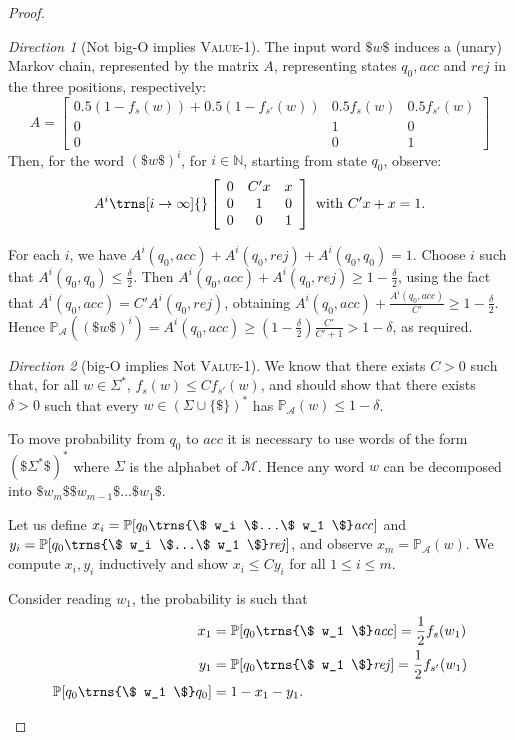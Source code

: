 \documentclass{lmcs}
\theoremstyle{plain}
\theoremstyle{definition}
\theoremstyle{remark}
\newtheorem{dir}{Direction}
\newcommand\acc{\mathit{acc}}
\newcommand\rej{\mathit{rej}}
\newcommand\lmc{\mathcal{M}}
\newcommand\pr{\mathbb{P}}
\newcommand\pa{\mathcal{A}}
\renewcommand\nu{f}
\begin{document}
\begin{proof}
\begin{dir}[Not big-O implies \textsc{Value-1}]
The input word $\$w\$$ induces a (unary) Markov chain, represented by the matrix $A$, representing states $q_0, \acc$ and $\rej$ in the three positions, respectively:\[A = \left[
\begin{array}{ccccc}
0.5(1-\nu_s(w)) + 0.5(1-\nu_{s'}(w))  & 0.5\nu_s(w) & 0.5\nu_{s'}(w) \\
0 & 1 & 0 \\
0 & 0 & 1
\end{array}
\right]
\]
Then, for the word $(\$w\$)^i$, for $i \in \mathbb{N}$, starting from state $q_0$, observe:
\[
A^i
\trns[i\to\infty]{}
\left[\begin{array}{ccccc}
0 & C' x & x \\
0 & 1 & 0 \\
0 & 0 & 1 \\
\end{array}\right] \text{ with } C'x + x = 1.
\]

For each $i$, we have $A^i(q_0,\acc) +A^i(q_0,\rej) +A^i(q_0,q_0)= 1 $. Choose $i$ such that $A^i(q_0,q_0) \le \frac{\delta}{2}$. Then $A^i(q_0,\acc) +A^i(q_0,\rej) \ge 1 -\frac{\delta}{2} $, using the fact that  $A^i(q_0,\acc) = C' A^i(q_0,\rej)$,  obtaining $A^i(q_0,\acc) +\frac{A^i(q_0,\acc)}{C'} \ge 1 - \frac{\delta}{2}$. Hence $\pr_\pa((\$w\$)^i) = A^i(q_0,\acc) \ge (1 - \frac{\delta}{2})\frac{C'}{C'+1} > 1-\delta $, as required.
\end{dir}

\begin{dir}[big-O implies Not \textsc{Value-1}]

We know that there exists $C > 0$ such that, for all $w \in \Sigma^*$, $\nu_s(w) \le C \nu_{s'}(w)$, and should show that there exists $\delta > 0 $ such that every $w \in (\Sigma \cup\{\$\})^*$ has $\pr_\pa(w) \le 1-\delta$.

To move probability from $q_0$ to $\acc$ it is necessary to use words of the form $(\$ \Sigma^* \$)^*$ where $\Sigma$ is the alphabet of $\lmc$. Hence any word $w$ can be decomposed into $\$ w_m \$\$ w_{m-1} \$...\$ w_1 \$$.

Let us define $x_i = \pr[q_0 \trns{\$ w_i \$...\$ w_1 \$} \acc]$ and $y_i = \pr[q_0 \trns{\$ w_i \$...\$ w_1 \$} \rej]$, and observe $x_m =  \pr_\pa(w)$. We compute $x_i,y_i$ inductively and show $x_i\le C y_i$ for all $1\le i\le m$.

Consider reading $w_1$, the probability is such that
\begin{align*}x_1 &= \pr[q_0 \trns{\$ w_1 \$} \acc] =\frac{1}{2} \nu_s(w_1) \\ y_1 &= \pr[q_0 \trns{\$ w_1 \$} \rej] =\frac{1}{2} \nu_{s'}(w_1) \\ \pr[q_0 \trns{\$ w_1 \$} q_0]  &= 1-x_1-y_1.\end{align*}


\end{dir}
\end{proof}
\end{document}
